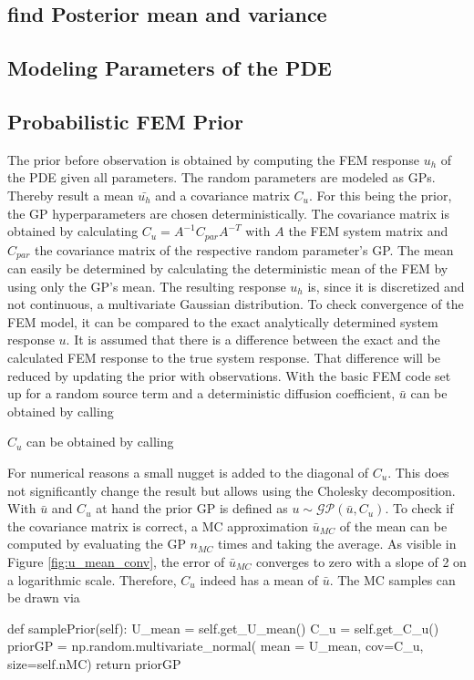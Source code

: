 \documentclass[%
  a4paper,oneside,%
  11pt,%
  smallchapters,
  green,%
  rgb, <cmyk>
  ,]{tubsbook}
\begin{document}
\subsection{find Posterior mean and variance}


\subsection{Modeling Parameters of the PDE}

\subsection{Probabilistic FEM Prior}
The prior before observation is obtained by computing the FEM response $u_h$ of the PDE given all parameters. The random parameters are modeled as GPs. Thereby result a mean $\bar{u_h}$ and a covariance matrix $C_u$. For this being the prior, the GP hyperparameters are chosen deterministically. The covariance matrix is obtained by calculating $C_u = A^{-1} C_{par} A^{-T}$ with $A$ the FEM system matrix and $C_{par}$ the covariance matrix of the respective random parameter's GP. The mean can easily be determined by calculating the deterministic mean of the FEM by using only the GP's mean.
The resulting response $u_h$ is, since it is discretized and not continuous, a multivariate Gaussian distribution.
%
To check convergence of the FEM model, it can be compared to the exact analytically determined system response $u$. 
%
It is assumed that there is a difference between the exact and the calculated FEM response to the true system response. That difference will be reduced by updating the prior with observations.
%
With the basic FEM code set up for a random source term and a deterministic diffusion coefficient, $\bar{u}$ can be obtained by calling


$C_u$ can be obtained by calling

For numerical reasons a small nugget is added to the diagonal of $C_u$. This does not significantly change the result but allows using the Cholesky decomposition.
With $\bar{u}$ and $C_u$ at hand the prior GP is defined as $u \sim \mathcal{GP}(\bar{u},C_u)$. To check if the covariance matrix is correct, a MC approximation $\bar{u}_{MC}$ of the mean can be computed by evaluating the GP $n_{MC}$ times and taking the average. As visible in Figure \ref{fig:u_mean_conv}, the error of $\bar{u}_{MC}$ converges to zero with a slope of 2 on a logarithmic scale. Therefore, $C_u$ indeed has a mean of $\bar{u}$.
The MC samples can be drawn via
\begin{python}
def samplePrior(self):
	U_mean = self.get_U_mean()
	C_u = self.get_C_u()
	priorGP = np.random.multivariate_normal(
		mean = U_mean, cov=C_u,
		size=self.nMC)
	return priorGP
\end{python}
\end{document}

